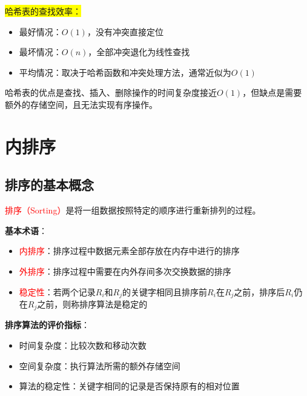 \documentclass{../../note}
\begin{document}
\colorbox{yellow}{哈希表的查找效率：}
\begin{itemize}
  \item 最好情况：$O(1)$，没有冲突直接定位
  \item 最坏情况：$O(n)$，全部冲突退化为线性查找
  \item 平均情况：取决于哈希函数和冲突处理方法，通常近似为$O(1)$
\end{itemize}

哈希表的优点是查找、插入、删除操作的时间复杂度接近$O(1)$，但缺点是需要额外的存储空间，且无法实现有序操作。

\section{内排序}

\subsection{排序的基本概念}

\textcolor{red}{排序（Sorting）}是将一组数据按照特定的顺序进行重新排列的过程。

\textbf{基本术语}：
\begin{itemize}
  \item \textcolor{red}{内排序}：排序过程中数据元素全部存放在内存中进行的排序
  \item \textcolor{red}{外排序}：排序过程中需要在内外存间多次交换数据的排序
  \item \textcolor{red}{稳定性}：若两个记录$R_i$和$R_j$的关键字相同且排序前$R_i$在$R_j$之前，排序后$R_i$仍在$R_j$之前，则称排序算法是稳定的
\end{itemize}

\textbf{排序算法的评价指标}：
\begin{itemize}
  \item 时间复杂度：比较次数和移动次数
  \item 空间复杂度：执行算法所需的额外存储空间
  \item 算法的稳定性：关键字相同的记录是否保持原有的相对位置
\end{itemize}
\end{document}
